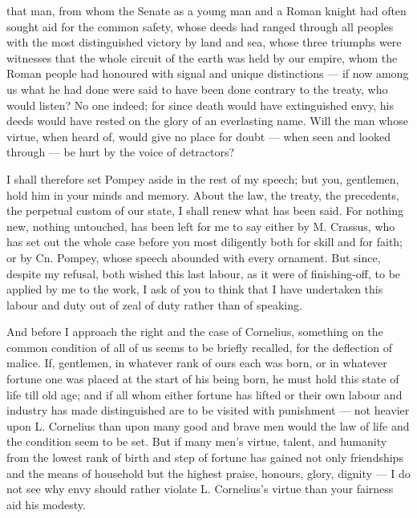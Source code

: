  that man, from whom the Senate as a young man and a Roman knight had often sought aid for the common safety, whose deeds had ranged through all peoples with the most distinguished victory by land and sea, whose three triumphs were witnesses that the whole circuit of the earth was held by our empire, whom the Roman people had honoured with signal and unique distinctions --- if now among us what he had done were said to have been done contrary to the treaty, who would listen? No one indeed; for since death would have extinguished envy, his deeds would have rested on the glory of an everlasting name. Will the man whose virtue, when heard of, would give no place for doubt --- when seen and looked through --- be hurt by the voice of detractors?

 I shall therefore set Pompey aside in the rest of my speech; but you, gentlemen, hold him in your minds and memory. About the law, the treaty, the precedents, the perpetual custom of our state, I shall renew what has been said. For nothing new, nothing untouched, has been left for me to say either by M. Crassus, who has set out the whole case before you most diligently both for skill and for faith; or by Cn. Pompey, whose speech abounded with every ornament. But since, despite my refusal, both wished this last labour, as it were of finishing-off, to be applied by me to the work, I ask of you to think that I have undertaken this labour and duty out of zeal of duty rather than of speaking.

 And before I approach the right and the case of Cornelius, something on the common condition of all of us seems to be briefly recalled, for the deflection of malice. If, gentlemen, in whatever rank of ours each was born, or in whatever fortune one was placed at the start of his being born, he must hold this state of life till old age; and if all whom either fortune has lifted or their own labour and industry has made distinguished are to be visited with punishment --- not heavier upon L. Cornelius than upon many good and brave men would the law of life and the condition seem to be set. But if many men's virtue, talent, and humanity from the lowest rank of birth and step of fortune has gained not only friendships and the means of household but the highest praise, honours, glory, dignity --- I do not see why envy should rather violate L. Cornelius's virtue than your fairness aid his modesty.

